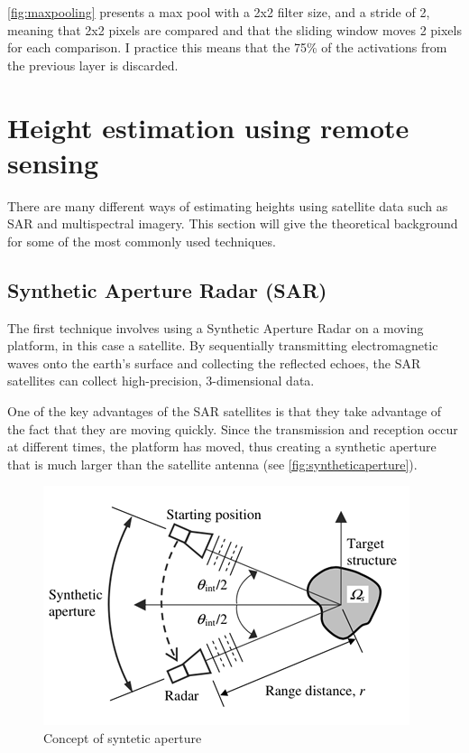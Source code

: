 \autoref{fig:maxpooling} presents a max pool with a 2x2 filter size, and a stride of 2, meaning that 2x2 pixels are compared and that the sliding window moves 2 pixels for each comparison. I practice this means that the 75\% of the activations from the previous layer is discarded.

\section{Height estimation using remote sensing}\label{section:theoreticheight}

There are many different ways of estimating heights using satellite data such as SAR and multispectral imagery. This section will give the theoretical background for some of the most commonly used techniques.

\subsection{Synthetic Aperture Radar (SAR)}
The first technique involves using a Synthetic Aperture Radar on a moving platform, in this case a satellite. By sequentially transmitting electromagnetic waves onto the earth's surface and collecting the reflected echoes, the SAR satellites can collect high-precision, 3-dimensional data.

One of the key advantages of the SAR satellites is that they take advantage of the fact that they are moving quickly. Since the transmission and reception occur at different times, the platform has moved, thus creating a synthetic aperture that is much larger than the satellite antenna (see \autoref{fig:syntheticaperture}).

\begin{figure}[!h]
	\centering
	\includegraphics[scale=0.7]{fig/sar.jpg}
	\caption{Concept of syntetic aperture \cite{Yu2012}}
	\label{fig:syntheticaperture}
\end{figure}

